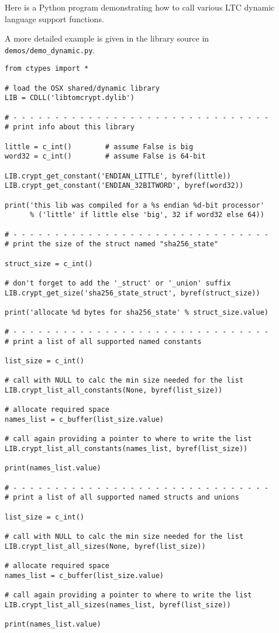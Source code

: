 \documentclass[synpaper]{book}
\begin{document}
Here is a Python program demonstrating how to call various LTC dynamic
language support functions.

A more detailed example is given in the library source in \texttt{demos/demo\_dynamic.py}.

\begin{verbatim}
from ctypes import *

# load the OSX shared/dynamic library
LIB = CDLL('libtomcrypt.dylib')

# - - - - - - - - - - - - - - - - - - - - - - - - - - - - - - -
# print info about this library

little = c_int()        # assume False is big
word32 = c_int()        # assume False is 64-bit

LIB.crypt_get_constant('ENDIAN_LITTLE', byref(little))
LIB.crypt_get_constant('ENDIAN_32BITWORD', byref(word32))

print('this lib was compiled for a %s endian %d-bit processor'
      % ('little' if little else 'big', 32 if word32 else 64))

# - - - - - - - - - - - - - - - - - - - - - - - - - - - - - - -
# print the size of the struct named "sha256_state"

struct_size = c_int()

# don't forget to add the '_struct' or '_union' suffix
LIB.crypt_get_size('sha256_state_struct', byref(struct_size))

print('allocate %d bytes for sha256_state' % struct_size.value)

# - - - - - - - - - - - - - - - - - - - - - - - - - - - - - - -
# print a list of all supported named constants

list_size = c_int()

# call with NULL to calc the min size needed for the list
LIB.crypt_list_all_constants(None, byref(list_size))

# allocate required space
names_list = c_buffer(list_size.value)

# call again providing a pointer to where to write the list
LIB.crypt_list_all_constants(names_list, byref(list_size))

print(names_list.value)

# - - - - - - - - - - - - - - - - - - - - - - - - - - - - - - -
# print a list of all supported named structs and unions

list_size = c_int()

# call with NULL to calc the min size needed for the list
LIB.crypt_list_all_sizes(None, byref(list_size))

# allocate required space
names_list = c_buffer(list_size.value)

# call again providing a pointer to where to write the list
LIB.crypt_list_all_sizes(names_list, byref(list_size))

print(names_list.value)
\end{verbatim}
\end{document}
